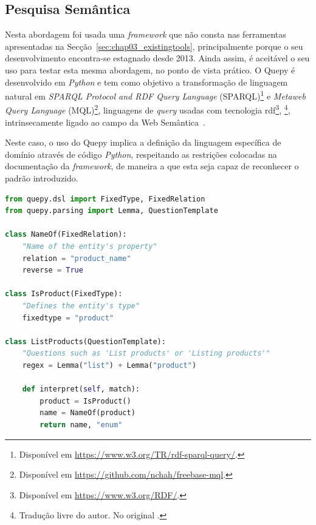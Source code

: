\subsection{Pesquisa Semântica}
Nesta abordagem foi usada uma \textit{framework} que não consta nas ferramentas apresentadas na Secção~\ref{sec:chap03_existingtools}, principalmente porque o seu desenvolvimento encontra-se estagnado desde 2013. Ainda assim, é aceitável o seu uso para testar esta mesma abordagem, no ponto de vista prático. O Quepy é desenvolvido em \textit{Python} e tem como objetivo a transformação de linguagem natural em \textit{SPARQL Protocol and RDF Query Language} (SPARQL)\footnote{Disponível em \url{https://www.w3.org/TR/rdf-sparql-query/}.} e \textit{Metaweb Query Language} (MQL)\footnote{Disponível em \url{https://github.com/nchah/freebase-mql}.}, linguagens de \textit{query} usadas com tecnologia \gls{rdf}\footnote{Disponível em \url{https://www.w3.org/RDF/}.}, \footnote{Tradução livre do autor. No original .}, intrinsecamente ligado ao campo da Web Semântica~\parencite{resource_description_framework}.

Neste caso, o uso do Quepy implica a definição da linguagem específica de domínio através de código \textit{Python}, respeitando as restrições colocadas na documentação da \textit{framework}, de maneira a que esta seja capaz de reconhecer o padrão introduzido.

\begin{lstlisting}[language=python, caption={Excerto da definição semântica da frase que lida com listagem de produtos},numbers=none,label=lst:quepyexample,basicstyle=\scriptsize]
from quepy.dsl import FixedType, FixedRelation
from quepy.parsing import Lemma, QuestionTemplate

class NameOf(FixedRelation):
    "Name of the entity's property"
    relation = "product_name"
    reverse = True

class IsProduct(FixedType):
    "Defines the entity's type"
    fixedtype = "product"

class ListProducts(QuestionTemplate):
    "Questions such as 'List products' or 'Listing products'"
    regex = Lemma("list") + Lemma("product")

    def interpret(self, match):
        product = IsProduct()
        name = NameOf(product)
        return name, "enum"

\end{lstlisting}

